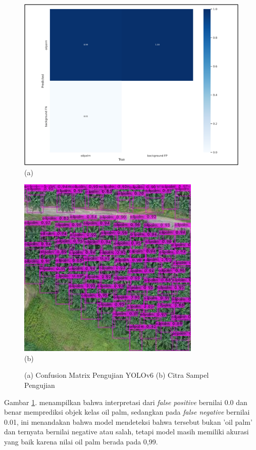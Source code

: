\begin{figure}[H]
	\vspace{-0.1cm}
	\begin{center}
		\includegraphics[width=0.5\columnwidth]{bab4/Gambar/Picture31.1.png}\\
		(a)
	\end{center}
	\begin{center}
		\includegraphics[width=0.5\columnwidth]{bab4/Gambar/Picture31.2.jpg}\\
		(b)
	\end{center}
	\vspace{-0.2cm}
	\captionsetup{justification=centering}
	\caption{(a) Confusion Matrix Pengujian YOLOv6 (b) Citra Sampel Pengujian}\label{img:Confusion-Matrix-Pengujian-YOLOv6-Citra-Sampel}
\end{figure}

Gambar \ref{img:Confusion-Matrix-Pengujian-YOLOv6-Citra-Sampel}. menampilkan bahwa interpretasi dari \textit{false positive} bernilai 0.0 dan benar memprediksi objek kelas oil palm, sedangkan pada \textit{false negative} bernilai 0.01, ini menandakan bahwa model mendeteksi bahwa tersebut bukan 'oil palm' dan ternyata bernilai negative atau salah, tetapi model masih memiliki akurasi yang baik karena nilai oil palm berada pada 0,99.

